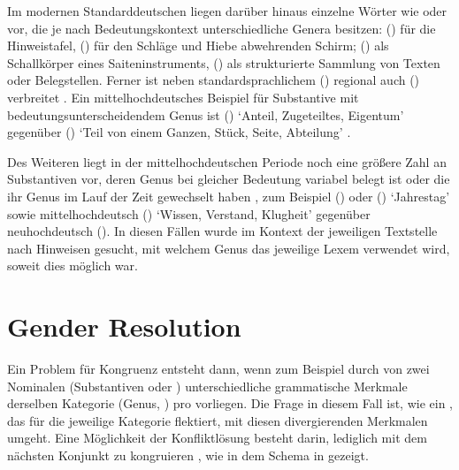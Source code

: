 Im modernen Standarddeutschen liegen darüber hinaus einzelne Wörter wie
 oder  vor, die je nach Bedeutungskontext
unterschiedliche Genera besitzen:  (\NeutI) für die
Hinweistafel,  (\MascI) für den Schläge und Hiebe abwehrenden
Schirm;  (\MascI) als Schallkörper eines Saiteninstruments,
 (\NeutI) als strukturierte Sammlung von Texten oder
Belegstellen. Ferner ist neben standardsprachlichem  (\FemI)
regional auch  (\MascI) verbreitet
\autocite[s.\,v.~\textit{der/die Butter}]{elspassmoeller2003}. Ein
mittelhochdeutsches Beispiel für
Substantive mit bedeutungs\-unterscheidendem Genus ist  (\MascI) `Anteil, Zugeteiltes, Eigentum' gegenüber 
(\NeutI) `Teil von einem Ganzen, Stück, Seite, Abteilung'
\autocite[s.\,v.~\textit{teil}]{lexer:mhdhwb}.

Des Weiteren liegt in der mittelhochdeutschen Periode
noch eine größere Zahl an Substantiven vor, deren Genus bei
gleicher Bedeutung variabel belegt ist oder die ihr Genus im Lauf der Zeit
gewechselt haben \autocite[157--166]{ksw2}, zum Beispiel  (\FemI)
oder  (\NeutI) `Jahrestag' sowie
mittel\-hoch\-deutsch  (\FemI) `Wissen,
Verstand, Klugheit' \autocite[vgl.][s.\,v.~\textit{witze}]{lexer:mhdhwb}
gegenüber neu\-hoch\-deutsch  (\MascI). In
diesen Fällen wurde im Kontext der jeweiligen Text\-stelle nach Hinweisen
gesucht, mit welchem Genus das jeweilige Lexem verwendet wird, soweit dies
möglich war.



\section{Gender Resolution}
\label{sec:gendres}

Ein Problem für Kongruenz entsteht dann, wenn zum Beispiel durch
 von zwei Nominalen (Substantiven oder
) unterschiedliche grammatische
Merkmale derselben Kategorie (Genus,
) pro  vorliegen. Die Frage in diesem Fall ist,
wie ein , das für die jeweilige Kategorie flektiert, mit diesen
divergierenden Merkmalen umgeht. Eine Möglichkeit der Konfliktlösung besteht
darin, lediglich mit dem nächsten Konjunkt zu kongruieren
\autocites[;
vgl.][179--180]{corbett1983}[168--170]{corbett2006}, wie in dem Schema in
 gezeigt.

